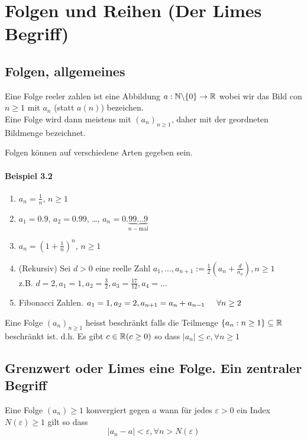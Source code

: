 \chapter{Folgen und Reihen (Der Limes Begriff)}
\section{Folgen, allgemeines}
\begin{definition}{3.1}
Eine Folge reeler zahlen ist eine Abbildung $a:\mathbb{N}\backslash\{0\}\to\mathbb{R}$ wobei wir das Bild con $n\geq 1$ mit $a_n$ (statt $a(n)$) bezeichen.\\

Eine Folge wird dann meistens mit $(a_n)_{n\geq 1}$, daher mit der geordneten Bildmenge bezeichnet.
\end{definition}

\noindent  Folgen können auf verschiedene Arten gegeben sein.
\subsubsection*{Beispiel 3.2}
\begin{enumerate}
\item $a_n=\frac{1}{n}$, $n\geq 1$
\item $a_1=0.9$, $a_2=0.99$, \dots, ${a_n} = 0.\underbrace {99 \ldots 9}_{n-\text{mal}}$
\item $a_n=\left( 1+\frac{1}{n}\right)^n$, $n\geq 1$
\item (Rekursiv) Sei $d>0$ eine reelle Zahl $a_1,\dots, a_{n+1}:=\frac{1}{2}\left( a_n + \frac{d}{a_n}\right), n\geq 1$\\
z.B. $d=2,a_1=1,a_2=\frac{3}{2},a_3=\frac{17}{12},a_4=\dots$
\item Fibonacci Zahlen. $a_1=1,a_2=2, a_{n+1}=a_n+a_{n-1}\hspace{5mm}\forall n\geq 2$
\end{enumerate}

\begin{definition}{3.3}
Eine Folge $(a_n)_{n\geq 1}$ heisst beschränkt falls die Teilmenge $\{a_n:n\geq 1\}\subseteq\mathbb{R}$ beschränkt ist. d.h. Es gibt $c\in\mathbb{R} (c\geq 0)$ so dass $\left| a_n\right| \leq c, \forall n\geq 1$ 
\end{definition}

\section{Grenzwert oder Limes eine Folge. Ein zentraler Begriff}
\begin{definition}{3.4}
Eine Folge $(a_n)\geq 1$ konvergiert gegen $a$ wann für jedes $\varepsilon>0$ ein Index $N(\varepsilon)\geq 1$ gilt so dass \[  \left| a_n-a\right| <\varepsilon, \forall n>N(\varepsilon)\] 
\end{definition}

